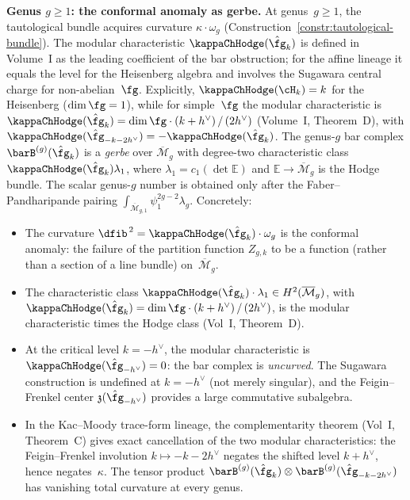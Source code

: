 \begin{example}
\medskip\noindent
\textbf{Genus $g \geq 1$: the conformal anomaly as gerbe.}
At genus~$g \geq 1$, the tautological bundle acquires curvature
$\kappa \cdot \omega_g$ (Construction~\ref{constr:tautological-bundle}).
The modular characteristic $\kappaChHodge(\hat{\fg}_k)$ is defined in
Volume~I as the leading coefficient of the bar obstruction; for
the affine lineage it equals the level for the Heisenberg algebra
and involves the Sugawara central charge for non-abelian~$\fg$.
Explicitly, $\kappaChHodge(\cH_k) = k$ for the Heisenberg ($\dim\fg = 1$),
while for simple~$\fg$ the modular characteristic is
$\kappaChHodge(\hat{\fg}_k) = \dim\fg\cdot(k+h^\vee)\,/\,(2h^\vee)$
(Volume~I, Theorem~D), with
$\kappaChHodge(\hat{\fg}_{-k-2h^\vee}) = -\kappaChHodge(\hat{\fg}_k)$. The
genus-$g$ bar complex $\barB^{(g)}(\hat{\fg}_k)$ is a
\emph{gerbe} over $\overline{\mathcal{M}}_g$ with
degree-two characteristic class
$\kappaChHodge(\hat{\fg}_k)\lambda_1$, where
$\lambda_1=c_1(\det\mathbb{E})$ and
$\mathbb{E}\to\overline{\mathcal{M}}_g$ is the Hodge bundle.
The scalar genus-$g$ number is obtained only after the
Faber--Pandharipande pairing
$\int_{\overline{\mathcal{M}}_{g,1}}\psi_1^{2g-2}\lambda_g$.
Concretely:
\begin{itemize}
\item The curvature $\dfib^{\,2} = \kappaChHodge(\hat{\fg}_k) \cdot
 \omega_g$ is the conformal anomaly: the failure of the
 partition function $Z_{g,k}$ to be a function (rather than a
 section of a line bundle) on~$\overline{\mathcal{M}}_g$.
\item The characteristic class
 $\kappaChHodge(\hat{\fg}_k) \cdot \lambda_1 \in H^2(\overline{\mathcal{M}}_g)$,
 with $\kappaChHodge(\hat{\fg}_k) = \dim\fg\cdot(k+h^\vee)\,/\,(2h^\vee)$, is
 the modular characteristic times the Hodge class (Vol~I,
 Theorem~D).
\item At the critical level $k = -h^\vee$, the modular
 characteristic is $\kappaChHodge(\hat{\fg}_{-h^\vee}) = 0$:
 the bar complex is \emph{uncurved}.
 The Sugawara construction is undefined at
 $k = -h^\vee$ (not merely singular), and the Feigin--Frenkel
 center $\mathfrak{z}(\hat{\fg}_{-h^\vee})$ provides a large
 commutative subalgebra.
\item In the Kac--Moody trace-form lineage, the complementarity
 theorem (Vol~I, Theorem~C) gives exact cancellation of the two
 modular characteristics: the Feigin--Frenkel involution
 $k\mapsto -k-2h^\vee$ negates the shifted level $k+h^\vee$,
 hence negates~$\kappa$. The tensor product
 $\barB^{(g)}(\hat{\fg}_k) \otimes
 \barB^{(g)}(\hat{\fg}_{-k-2h^\vee})$ has vanishing total
 curvature at every genus.
\end{itemize}
\end{example}

